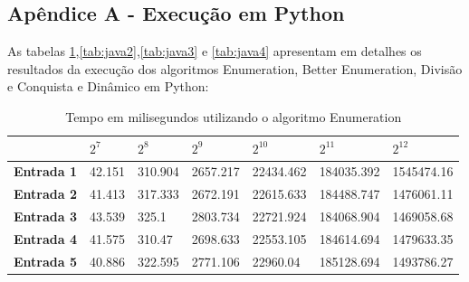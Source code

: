 \documentclass[
	12pt,				%
	oneside,   	        %
	a4paper,			%
	english,			%
	french,				%
	spanish,			%
	brazil,				%
	]{pacotes/abntex2}
\begin{document}
\begin{apendicesenv}

\section*{Apêndice A - Execução em Python}

As tabelas \ref{tab:java1},\ref{tab:java2},\ref{tab:java3} e \ref{tab:java4} apresentam em detalhes os resultados da execução dos
algoritmos Enumeration, Better Enumeration, Divisão e Conquista e Dinâmico em Python:

\begin{table}[!htb]
\centering
\caption{Tempo em milisegundos utilizando o algoritmo Enumeration}
\label{tab:java1}
\footnotesize   %
\begin{tabular}{l|llllll}
\toprule
& \textbf{$2^7$} & \textbf{$2^8$} & \textbf{$2^9$} & \textbf{$2^{10}$} & \textbf{$2^{11}$} & \textbf{$2^{12}$}\\ 
\midrule
\textbf{Entrada 1} & 42.151 & 310.904 & 2657.217 & 22434.462 & 184035.392 & 1545474.16 \\
\textbf{Entrada 2} & 41.413 & 317.333 & 2672.191 & 22615.633 & 184488.747 & 1476061.11 \\
\textbf{Entrada 3} & 43.539 & 325.1 & 2803.734 & 22721.924 & 184068.904 & 1469058.68\\
\textbf{Entrada 4} & 41.575 & 310.47 & 2698.633 & 22553.105 & 184614.694 & 1479633.35 \\
\textbf{Entrada 5} & 40.886 & 322.595 & 2771.106 & 22960.04 & 185128.694 & 1493786.27 \\
 \bottomrule
\end{tabular}
\end{table}



\end{apendicesenv}
\end{document}

